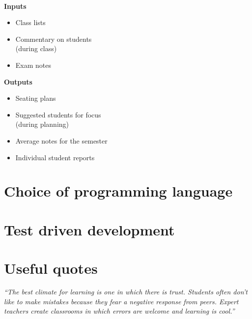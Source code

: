 \documentclass[10pt]{article}
\begin{document}
\

\begin{minipage}[t]{0.45\textwidth}

\textbf{Inputs}

\begin{itemize}
\item Class lists
\item Commentary on students \\
(during class)
\item Exam notes
\end{itemize}


\end{minipage}
\hfill
\vline
\hfill
\begin{minipage}[t]{0.45\textwidth}

\textbf{Outputs}

\begin{itemize}
\item Seating plans
\item Suggested students for focus \\
(during planning)
\item Average notes for the semester
\item Individual student reports
\end{itemize}



\end{minipage}

\section{Choice of programming language}

\section{Test driven development}

\section{Useful quotes}
 
\begin{center} 
\emph{``The best climate for learning is one in which there is trust. Students often don’t like to make mistakes because they fear a negative response from peers. Expert teachers create classrooms in which errors are welcome and learning is cool.''} \cite{Hat12}
\end{center}
 
\end{document}
